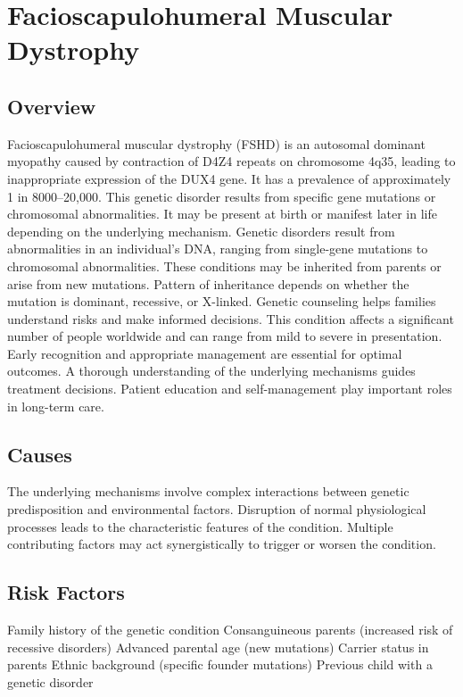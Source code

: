 \chapter{Facioscapulohumeral Muscular Dystrophy}
\label{sec:Facioscapulohumeral Muscular Dystrophy}

\section{Overview}
Facioscapulohumeral muscular dystrophy (FSHD) is an autosomal dominant myopathy caused by contraction of D4Z4 repeats on chromosome 4q35, leading to inappropriate expression of the DUX4 gene. It has a prevalence of approximately 1 in 8000--20,000. This genetic disorder results from specific gene mutations or chromosomal abnormalities. It may be present at birth or manifest later in life depending on the underlying mechanism. Genetic disorders result from abnormalities in an individual's DNA, ranging from single-gene mutations to chromosomal abnormalities. These conditions may be inherited from parents or arise from new mutations. Pattern of inheritance depends on whether the mutation is dominant, recessive, or X-linked. Genetic counseling helps families understand risks and make informed decisions. This condition affects a significant number of people worldwide and can range from mild to severe in presentation. Early recognition and appropriate management are essential for optimal outcomes. A thorough understanding of the underlying mechanisms guides treatment decisions. Patient education and self-management play important roles in long-term care.
\section{Causes}
The underlying mechanisms involve complex interactions between genetic predisposition and environmental factors. Disruption of normal physiological processes leads to the characteristic features of the condition. Multiple contributing factors may act synergistically to trigger or worsen the condition.
\section{Risk Factors}
Family history of the genetic condition Consanguineous parents (increased risk of recessive disorders) Advanced parental age (new mutations) Carrier status in parents Ethnic background (specific founder mutations) Previous child with a genetic disorder

